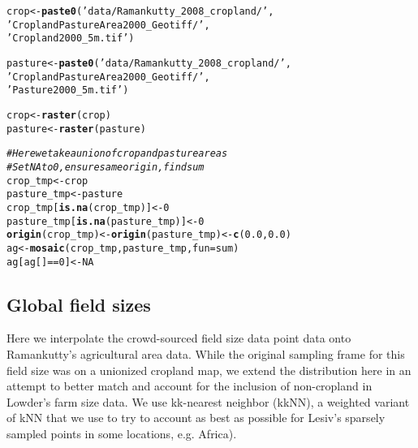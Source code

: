 \documentclass{article}\usepackage[]{graphicx}\usepackage[]{xcolor}
\makeatletter
\newcommand{\hlnum}[1]{\textcolor[rgb]{0.686,0.059,0.569}{#1}}%
\newcommand{\hlstr}[1]{\textcolor[rgb]{0.192,0.494,0.8}{#1}}%
\newcommand{\hlcom}[1]{\textcolor[rgb]{0.678,0.584,0.686}{\textit{#1}}}%
\newcommand{\hlopt}[1]{\textcolor[rgb]{0,0,0}{#1}}%
\newcommand{\hlstd}[1]{\textcolor[rgb]{0.345,0.345,0.345}{#1}}%
\newcommand{\hlkwb}[1]{\textcolor[rgb]{0.69,0.353,0.396}{#1}}%
\newcommand{\hlkwc}[1]{\textcolor[rgb]{0.333,0.667,0.333}{#1}}%
\newcommand{\hlkwd}[1]{\textcolor[rgb]{0.737,0.353,0.396}{\textbf{#1}}}%
\newenvironment{kframe}{%
 \def\at@end@of@kframe{}%
 \ifinner\ifhmode%
  \def\at@end@of@kframe{\end{minipage}}%
  \begin{minipage}{\columnwidth}%
 \fi\fi%
 \def\FrameCommand##1{\hskip\@totalleftmargin \hskip-\fboxsep
 \colorbox{shadecolor}{##1}\hskip-\fboxsep
     \hskip-\linewidth \hskip-\@totalleftmargin \hskip\columnwidth}%
 \MakeFramed {\advance\hsize-\width
   \@totalleftmargin\z@ \linewidth\hsize
   \@setminipage}}%
 {\par\unskip\endMakeFramed%
 \at@end@of@kframe}
\newenvironment{knitrout}{}{} %
\makeatother
\begin{document}
\begin{knitrout}
\color{fgcolor}\begin{kframe}
\begin{alltt}
\hlstd{crop} \hlkwb{<-} \hlkwd{paste0}\hlstd{(}\hlstr{'data/Ramankutty_2008_cropland/'}\hlstd{,}
                \hlstr{'CroplandPastureArea2000_Geotiff/'}\hlstd{,}
                \hlstr{'Cropland2000_5m.tif'}\hlstd{)}

\hlstd{pasture} \hlkwb{<-} \hlkwd{paste0}\hlstd{(}\hlstr{'data/Ramankutty_2008_cropland/'}\hlstd{,}
                  \hlstr{'CroplandPastureArea2000_Geotiff/'}\hlstd{,}
                  \hlstr{'Pasture2000_5m.tif'}\hlstd{)}

\hlstd{crop} \hlkwb{<-} \hlkwd{raster}\hlstd{(crop)}
\hlstd{pasture} \hlkwb{<-} \hlkwd{raster}\hlstd{(pasture)}

\hlcom{# Here we take a union of crop and pasture areas}
\hlcom{# Set NA to 0, ensure same origin, find sum }
\hlstd{crop_tmp} \hlkwb{<-} \hlstd{crop}
\hlstd{pasture_tmp} \hlkwb{<-} \hlstd{pasture}
\hlstd{crop_tmp[}\hlkwd{is.na}\hlstd{(crop_tmp)]} \hlkwb{<-} \hlnum{0}
\hlstd{pasture_tmp[}\hlkwd{is.na}\hlstd{(pasture_tmp)]} \hlkwb{<-} \hlnum{0}
\hlkwd{origin}\hlstd{(crop_tmp)} \hlkwb{<-} \hlkwd{origin}\hlstd{(pasture_tmp)} \hlkwb{<-} \hlkwd{c}\hlstd{(}\hlnum{0.0}\hlstd{,} \hlnum{0.0}\hlstd{)}
\hlstd{ag} \hlkwb{<-}\hlkwd{mosaic}\hlstd{(crop_tmp, pasture_tmp,} \hlkwc{fun} \hlstd{= sum)}
\hlstd{ag[ag[]} \hlopt{==} \hlnum{0}\hlstd{]} \hlkwb{<-} \hlnum{NA}
\end{alltt}
\end{kframe}
\end{knitrout}

\subsection{Global field sizes}

Here we interpolate the crowd-sourced field size data point data onto Ramankutty's agricultural area data. While the original sampling frame for this field size was on a unionized cropland map, we extend the distribution here in an attempt to better match and account for the inclusion of non-cropland in Lowder's farm size data. We use kk-nearest neighbor (kkNN), a weighted variant of kNN that we use to try to account as best as possible for Lesiv’s sparsely sampled points in some locations, e.g. Africa).
\end{document}

